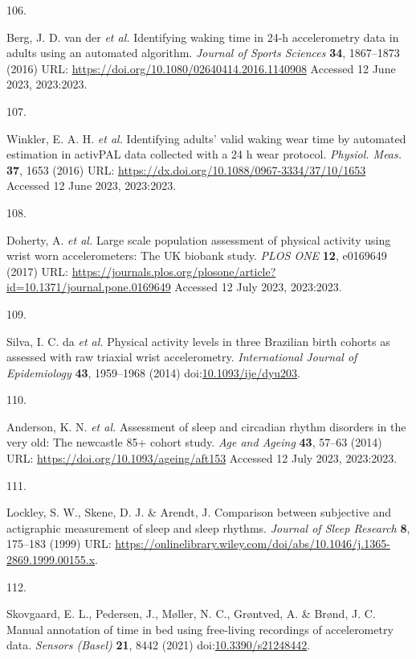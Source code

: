\documentclass[
  10pt,
]{scrbook}
\newlength{\cslhangindent}
\newlength{\csllabelwidth}
\newlength{\cslentryspacingunit} %
\newenvironment{CSLReferences}[2] %
 {%
  \setlength{\parindent}{0pt}
  \ifodd #1
  \let\oldpar\par
  \def\par{\hangindent=\cslhangindent\oldpar}
  \fi
  \setlength{\parskip}{#2\cslentryspacingunit}
 }%
 {}
\newcommand{\CSLLeftMargin}[1]{\parbox[t]{\csllabelwidth}{#1}}
\newcommand{\CSLRightInline}[1]{\parbox[t]{\linewidth - \csllabelwidth}{#1}\break}
\begin{document}
\begin{CSLReferences}{0}{0}
\leavevmode{}%
\CSLLeftMargin{106. }%
\CSLRightInline{Berg, J. D. van der \emph{et al.} Identifying waking
time in 24-h accelerometry data in adults using an automated algorithm.
\emph{Journal of Sports Sciences} \textbf{34}, 1867--1873 (2016) URL:
\url{https://doi.org/10.1080/02640414.2016.1140908} Accessed 12 June
2023, 2023:2023.}

\leavevmode{}%
\CSLLeftMargin{107. }%
\CSLRightInline{Winkler, E. A. H. \emph{et al.} Identifying adults'
valid waking wear time by automated estimation in {activPAL} data
collected with a 24 h wear protocol. \emph{Physiol. Meas.} \textbf{37},
1653 (2016) URL: \url{https://dx.doi.org/10.1088/0967-3334/37/10/1653}
Accessed 12 June 2023, 2023:2023.}

\leavevmode{}%
\CSLLeftMargin{108. }%
\CSLRightInline{Doherty, A. \emph{et al.} Large scale population
assessment of physical activity using wrist worn accelerometers: The
{UK} biobank study. \emph{{PLOS} {ONE}} \textbf{12}, e0169649 (2017)
URL:
\url{https://journals.plos.org/plosone/article?id=10.1371/journal.pone.0169649}
Accessed 12 July 2023, 2023:2023.}

\leavevmode{}%
\CSLLeftMargin{109. }%
\CSLRightInline{Silva, I. C. da \emph{et al.} Physical activity levels
in three Brazilian birth cohorts as assessed with raw triaxial wrist
accelerometry. \emph{International Journal of Epidemiology} \textbf{43},
1959--1968 (2014)
doi:\href{https://doi.org/10.1093/ije/dyu203}{10.1093/ije/dyu203}.}

\leavevmode{}%
\CSLLeftMargin{110. }%
\CSLRightInline{Anderson, K. N. \emph{et al.} Assessment of sleep and
circadian rhythm disorders in the very old: The newcastle 85+ cohort
study. \emph{Age and Ageing} \textbf{43}, 57--63 (2014) URL:
\url{https://doi.org/10.1093/ageing/aft153} Accessed 12 July 2023,
2023:2023.}

\leavevmode{}%
\CSLLeftMargin{111. }%
\CSLRightInline{Lockley, S. W., Skene, D. J. \& Arendt, J. Comparison
between subjective and actigraphic measurement of sleep and sleep
rhythms. \emph{Journal of Sleep Research} \textbf{8}, 175--183 (1999)
URL:
\url{https://onlinelibrary.wiley.com/doi/abs/10.1046/j.1365-2869.1999.00155.x}.}

\leavevmode{}%
\CSLLeftMargin{112. }%
\CSLRightInline{Skovgaard, E. L., Pedersen, J., Møller, N. C., Grøntved,
A. \& Brønd, J. C. Manual annotation of time in bed using free-living
recordings of accelerometry data. \emph{Sensors (Basel)} \textbf{21},
8442 (2021)
doi:\href{https://doi.org/10.3390/s21248442}{10.3390/s21248442}.}


\end{CSLReferences}
\end{document}

